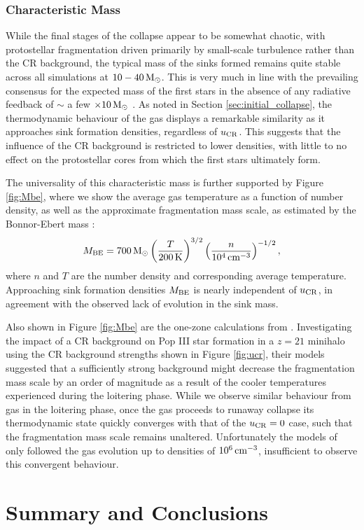 \documentclass[usenatbib]{mn2e}
\newcommand{\kelvin}{\,{\rm K}}
\newcommand{\cc}{\,{\rm cm}^{-3}}
\newcommand{\msun}{\,{\rm M}_{\odot}}
\newcommand{\ucr}{{u}_{\rm \small CR}}
\begin{document}
\subsubsection{Characteristic Mass}

While the final stages of the collapse appear to be somewhat chaotic, with protostellar fragmentation driven primarily by small-scale turbulence rather than the CR background, the typical mass of the sinks formed remains quite stable across all simulations at $10-40\msun$.
This is very much in line with the prevailing consensus for the expected mass of the first stars in the absence of any radiative feedback of $\sim$ a few $\times10\msun$ \citep{Bromm2013}.  
As noted in Section \ref{sec:initial_collapse}, the thermodynamic behaviour of the gas displays a remarkable similarity as it approaches sink formation densities, regardless of $\ucr$.
This suggests that the influence of the CR background is restricted to lower densities, with little to no effect on the protostellar cores from which the first stars ultimately form.

The universality of this characteristic mass is further supported by Figure \ref{fig:Mbe}, where we show the average gas temperature as a function of number density, as well as the approximate fragmentation mass scale, as estimated by the Bonnor-Ebert mass \citep[e.g.,][]{StacyBromm2007}:
\begin{equation}
    M_{\rm \small BE} = 700\msun \left(\frac{T}{200\kelvin}\right)^{3/2}
                                 \left(\frac{n}{10^4\cc}   \right)^{-1/2},
\end{equation}
where $n$ and $T$ are the number density and corresponding average temperature.
Approaching sink formation densities $M_{\rm \small BE}$ is nearly independent of $\ucr$, in agreement with the observed lack of evolution in the sink mass.

Also shown in Figure \ref{fig:Mbe} are the one-zone calculations from \citet{StacyBromm2007}.
Investigating the impact of a CR background on Pop III star formation in a $z=21$ minihalo using the CR background strengths shown in Figure \ref{fig:ucr}, their models suggested 
that a sufficiently strong background might decrease the fragmentation mass scale by an order of magnitude as a result of the cooler temperatures experienced during the loitering phase.
While we observe similar behaviour from gas in the loitering phase, once the gas proceeds to runaway collapse its thermodynamic state quickly converges with that of the $\ucr=0$ case, such that the fragmentation mass scale remains unaltered.
Unfortunately the models of \citet{StacyBromm2007} only followed the gas evolution up to densities of $10^6\cc$, insufficient to observe this convergent behaviour.

\section{Summary and Conclusions}
\label{conclusions}



\end{document}
